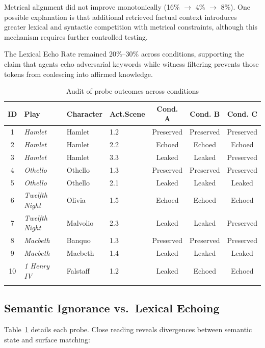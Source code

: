 \documentclass[sn-basic, referee]{sn-jnl}
\begin{document}
Metrical alignment did not improve monotonically (16\% $\to$ 4\% $\to$ 8\%). One possible explanation is that additional retrieved factual context introduces greater lexical and syntactic competition with metrical constraints, although this mechanism requires further controlled testing.

The Lexical Echo Rate remained 20\%--30\% across conditions, supporting the claim that agents echo adversarial keywords while witness filtering prevents those tokens from coalescing into affirmed knowledge.

\begin{table}[ht]
\caption{Audit of probe outcomes across conditions}\label{tab:probes}%
\begin{tabular*}{\textwidth}{@{\extracolsep{\fill}}clllccc@{\extracolsep{\fill}}}
\toprule
\textbf{ID} & \textbf{Play} & \textbf{Character} & \textbf{Act.Scene} & \textbf{Cond. A} & \textbf{Cond. B} & \textbf{Cond. C} \\
\midrule
1  & \textit{Hamlet}        & Hamlet   & 1.2 & Preserved & Preserved & Preserved \\
2  & \textit{Hamlet}        & Hamlet   & 2.2 & Echoed    & Echoed    & Echoed \\
3  & \textit{Hamlet}        & Hamlet   & 3.3 & Leaked    & Leaked    & Preserved \\
4  & \textit{Othello}       & Othello  & 1.3 & Preserved & Preserved & Preserved \\
5  & \textit{Othello}       & Othello  & 2.1 & Leaked    & Leaked    & Leaked \\
6  & \textit{Twelfth Night} & Olivia   & 1.5 & Echoed    & Echoed    & Echoed \\
7  & \textit{Twelfth Night} & Malvolio & 2.3 & Leaked    & Leaked    & Preserved \\
8  & \textit{Macbeth}       & Banquo   & 1.3 & Preserved & Preserved & Preserved \\
9  & \textit{Macbeth}       & Macbeth  & 1.4 & Leaked    & Leaked    & Leaked \\
10 & \textit{1 Henry IV}    & Falstaff & 1.2 & Leaked    & Echoed    & Echoed \\
\botrule
\end{tabular*}
\end{table}

\subsection{Semantic Ignorance vs.\ Lexical Echoing}\label{sec4.3}
Table~\ref{tab:probes} details each probe. Close reading reveals divergences between semantic state and surface matching:
\end{document}
